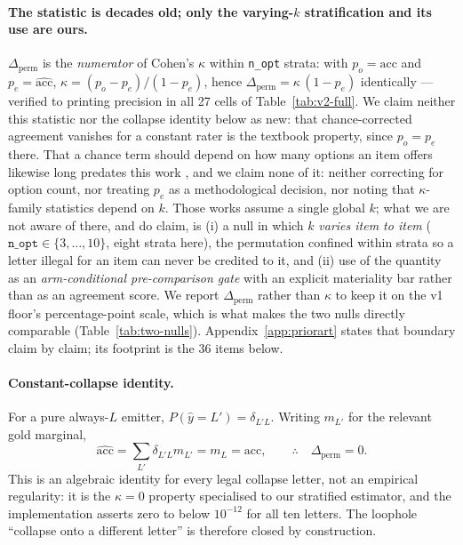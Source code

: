 \paragraph{The statistic is decades old; only the varying-$k$ stratification and its use are ours.}
$\Delta_{\mathrm{perm}}$ is the \emph{numerator} of Cohen's $\kappa$ within \texttt{n\_opt}
strata: with $p_o=\mathrm{acc}$ and $p_e=\widehat{\mathrm{acc}}$, $\kappa=(p_o-p_e)/(1-p_e)$,
hence $\Delta_{\mathrm{perm}}=\kappa\,(1-p_e)$ identically --- verified to printing precision in
all 27 cells of Table~\ref{tab:v2-full}. We claim neither this statistic nor the collapse
identity below as new: that chance-corrected agreement vanishes for a constant rater is the
textbook property, since $p_o=p_e$ there. That a chance term should depend on how many options
an item offers likewise long predates this work
\citep{bennett1954communications,brennan1981kappa,frary1988formula,brenner1996weightedkappa,%
devries2008pooledkappa}, and we claim none of it: neither correcting for option count, nor treating
$p_e$ as a methodological decision, nor noting that $\kappa$-family statistics depend on $k$. Those
works assume a single global $k$; what we are not aware of there, and do claim, is (i) a null in
which $k$ \emph{varies item to item} ($\texttt{n\_opt}\in\{3,\dots,10\}$, eight strata here), the
permutation confined within strata so a letter illegal for an item can never be credited to it, and
(ii) use of the quantity as an \emph{arm-conditional pre-comparison gate} with an explicit
materiality bar rather than as an agreement score. We report $\Delta_{\mathrm{perm}}$ rather than
$\kappa$ to keep it on the v1 floor's percentage-point scale, which is what makes the two nulls
directly comparable (Table~\ref{tab:two-nulls}). Appendix~\ref{app:priorart} states that boundary
claim by claim; its footprint is the $36$ items below.

\paragraph{Constant-collapse identity.}
For a pure always-$L$ emitter, $P(\hat{y}=L')=\delta_{L'L}$. Writing $m_{L'}$ for the relevant gold marginal,
\begin{equation}
\widehat{\mathrm{acc}}
=\sum_{L'}\delta_{L'L}m_{L'}
=m_{L}
=\mathrm{acc},
\qquad
\therefore\quad \Delta_{\mathrm{perm}}=0.
\end{equation}
This is an algebraic identity for every legal collapse letter, not an empirical regularity: it is the $\kappa=0$ property specialised to our stratified estimator, and the implementation asserts zero to below $10^{-12}$ for all ten letters. The loophole ``collapse onto a different letter'' is therefore closed by construction.

